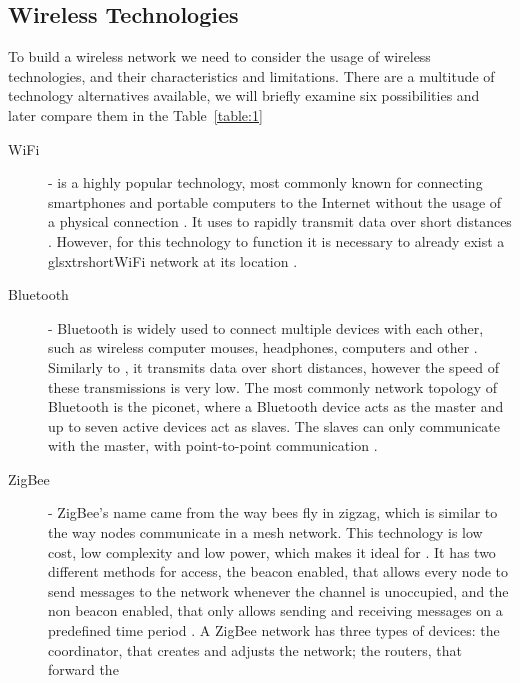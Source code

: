 \subsection{Wireless Technologies}
\label{subsec:wsn_wireless_technologies}
To build a wireless network we need to consider the usage of wireless technologies, and their
characteristics and limitations. There are a multitude of technology alternatives available,
we will briefly examine six possibilities and later compare them in the Table~\ref{table:1}
\begin{description}
      \item[\Gls{WiFi}] -  is a highly popular technology, most commonly
            known for connecting smartphones and portable computers to the Internet without
            the usage of a physical connection \cite{Sidhu2007}. It uses  to
            rapidly transmit data over short distances \cite{Khan2016}. However, for this
            technology to function it is necessary to already exist a glsxtrshort{WiFi}
            network at its location \cite{Nelson2020}.
      \item[Bluetooth] - Bluetooth is widely used to connect multiple devices with each other,
            such as wireless computer mouses, headphones, computers and other \cite{Wang2021}.
            Similarly to , it transmits data over short distances, however
            the speed of these transmissions is very low. The most commonly network topology
            of Bluetooth is the piconet, where a Bluetooth device acts as the master and up to
            seven active devices act as slaves. The slaves can only communicate with the master,
            with point-to-point communication \cite{Cope2017, Lee2007}.
      \item[ZigBee] - ZigBee's name came from the way bees fly in zigzag, which is similar to
            the way nodes communicate in a mesh network. This technology is low cost, low
            complexity and low power, which makes it ideal for . It has two
            different methods for access, the beacon enabled, that allows every node to send
            messages to the network whenever the channel is unoccupied, and the non beacon
            enabled, that only allows sending and receiving messages on a predefined time
            period \cite{Kaushal2014}. A ZigBee network has three types of devices: the
            coordinator, that creates and adjusts the network; the routers, that forward the

\end{description}
